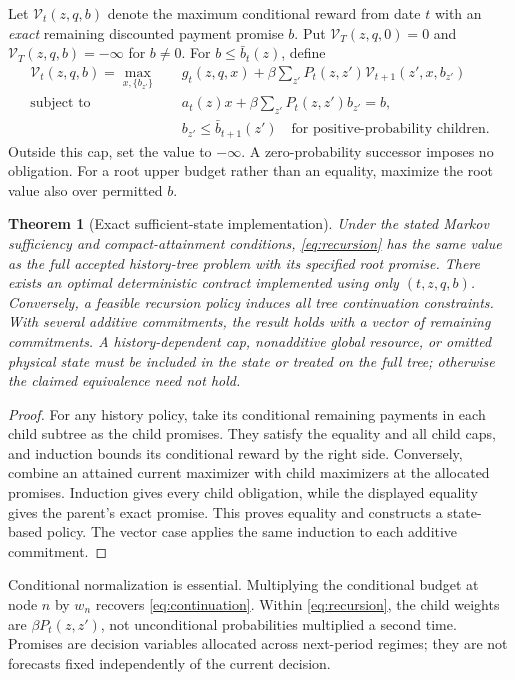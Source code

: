 \documentclass[11pt,letterpaper]{article}
\newtheorem{theorem}{Theorem}[section]
\theoremstyle{definition}\newtheorem{assumption}[theorem]{Assumption}
\begin{document}
Let $\mathcal V_t(z,q,b)$ denote the maximum conditional reward from date $t$ with an \emph{exact} remaining discounted payment promise $b$. Put $\mathcal V_T(z,q,0)=0$ and $\mathcal V_T(z,q,b)=-\infty$ for $b\ne0$. For $b\leq\bar b_t(z)$, define
\begin{equation}\label{eq:recursion}
 \begin{split}
 \mathcal V_t(z,q,b)=\max_{x,\{b_{z'}\}}\quad&
 g_t(z,q,x)+\beta\sum_{z'}P_t(z,z')\mathcal V_{t+1}(z',x,b_{z'})\\
 \text{subject to}\quad& a_t(z)x+\beta\sum_{z'}P_t(z,z')b_{z'}=b,\\
 &b_{z'}\leq\bar b_{t+1}(z')\quad\text{for positive-probability children}.
 \end{split}
\end{equation}
Outside this cap, set the value to $-\infty$. A zero-probability successor imposes no obligation. For a root upper budget rather than an equality, maximize the root value also over permitted $b$.

\begin{theorem}[Exact sufficient-state implementation]\label{thm:recursion}
Under the stated Markov sufficiency and compact-attainment conditions, \eqref{eq:recursion} has the same value as the full accepted history-tree problem with its specified root promise. There exists an optimal deterministic contract implemented using only $(t,z,q,b)$. Conversely, a feasible recursion policy induces all tree continuation constraints. With several additive commitments, the result holds with a vector of remaining commitments. A history-dependent cap, nonadditive global resource, or omitted physical state must be included in the state or treated on the full tree; otherwise the claimed equivalence need not hold.
\end{theorem}
\begin{proof}
For any history policy, take its conditional remaining payments in each child subtree as the child promises. They satisfy the equality and all child caps, and induction bounds its conditional reward by the right side. Conversely, combine an attained current maximizer with child maximizers at the allocated promises. Induction gives every child obligation, while the displayed equality gives the parent's exact promise. This proves equality and constructs a state-based policy. The vector case applies the same induction to each additive commitment.\end{proof}

Conditional normalization is essential. Multiplying the conditional budget at node $n$ by $w_n$ recovers \eqref{eq:continuation}. Within \eqref{eq:recursion}, the child weights are $\beta P_t(z,z')$, not unconditional probabilities multiplied a second time. Promises are decision variables allocated across next-period regimes; they are not forecasts fixed independently of the current decision.
\end{document}
